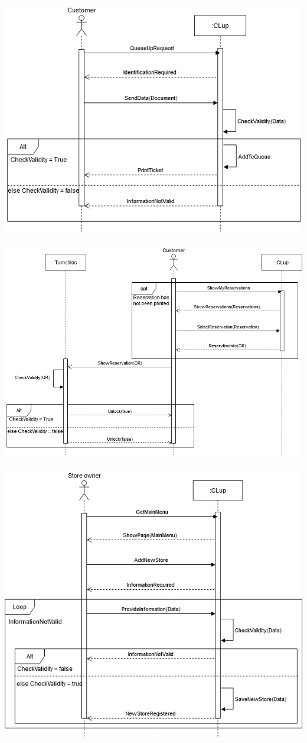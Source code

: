 \includegraphics[scale=0.5]{Images/UseCase5Diagram.png}\\\\
\includegraphics[scale=0.5]{Images/UseCase6-7Diagram.png}\\\\
\includegraphics[scale=0.5]{Images/UseCase8Diagram.png}\\\\
